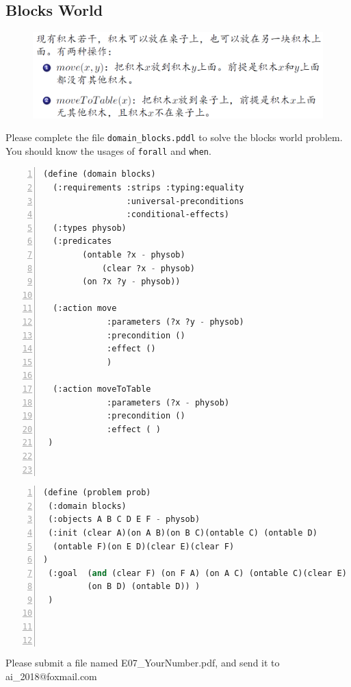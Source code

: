 ﻿\documentclass[a4paper, 11pt]{article}
\begin{document}
\subsection{Blocks World}
\label{sec:blocksworld}
\begin{figure}[h]
  \centering
  \includegraphics[width=17cm]{Pic/blocks}
\end{figure}

Please complete the file \texttt{domain\_blocks.pddl} to solve the blocks world problem. You should know the usages of \texttt{forall} and \texttt{when}.

\begin{lstlisting}[title=domain\_blocks.pddl,frame=single,language=lisp,numbers=left]
(define (domain blocks)
  (:requirements :strips :typing:equality
                 :universal-preconditions
                 :conditional-effects)
  (:types physob)
  (:predicates
  	    (ontable ?x - physob)
            (clear ?x - physob)	
	    (on ?x ?y - physob))
		
  (:action move
             :parameters (?x ?y - physob)
             :precondition ()
             :effect ()
             )

  (:action moveToTable
             :parameters (?x - physob)
             :precondition ()
             :effect ( )
 )



\end{lstlisting}

\label{sec:problem-description}

\begin{lstlisting}[title=blocks.pddl,frame=single,language=lisp,numbers=left]
(define (problem prob)
 (:domain blocks)
 (:objects A B C D E F - physob)
 (:init (clear A)(on A B)(on B C)(ontable C) (ontable D)
  (ontable F)(on E D)(clear E)(clear F)
)
 (:goal  (and (clear F) (on F A) (on A C) (ontable C)(clear E) (on E B)
         (on B D) (ontable D)) )
 )




\end{lstlisting}
Please submit a file named \textsf{E07\_YourNumber.pdf}, and send it to \textsf{ai\_2018@foxmail.com}
\end{document}
